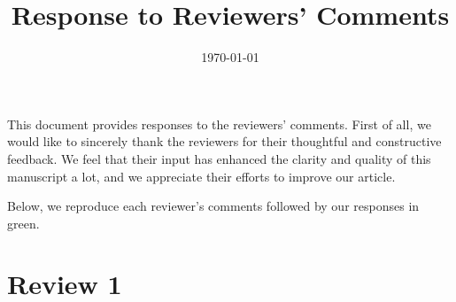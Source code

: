 \documentclass{article}
\title{Response to Reviewers' Comments}
\date{\today}
\begin{document}
\maketitle

This document provides responses to the reviewers' comments. First of all, we would like to sincerely thank the reviewers for their thoughtful and constructive feedback. We feel that their input has enhanced the clarity and quality of this manuscript a lot, and we appreciate their efforts to improve our article.

Below, we reproduce each reviewer's comments followed by our responses in green.

\section*{Review 1}
\end{document}
